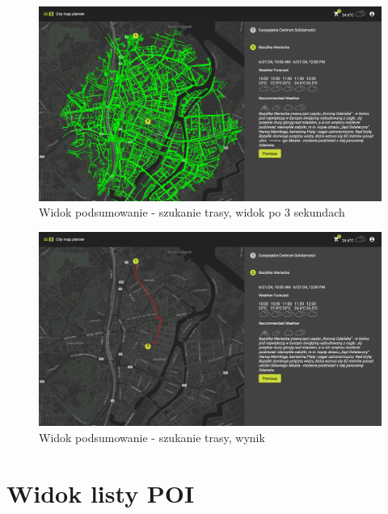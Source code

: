 \begin{figure}[H]
    \centering
    \includegraphics[width=1\textwidth]{attachments/g2}
    \caption{Widok podsumowanie - szukanie trasy, widok po 3 sekundach}
    \label{fig:podsumowanie-s2}
\end{figure}

\begin{figure}[H]
    \centering
    \includegraphics[width=1\textwidth]{attachments/g3}
    \caption{Widok podsumowanie - szukanie trasy, wynik}
    \label{fig:podsumowanie-s3}
\end{figure}

\section{Widok listy POI}
\label{sec:poilist}

